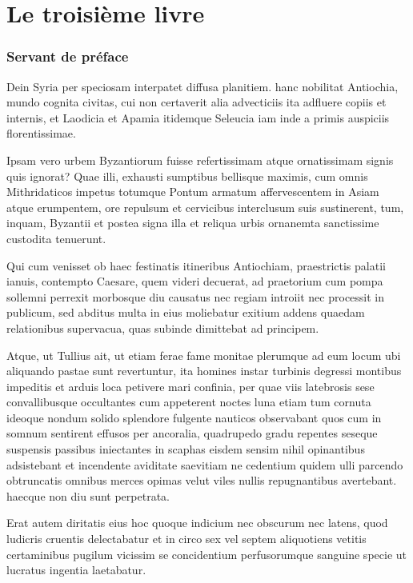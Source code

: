 
\part{Le troisième livre}
\section{Servant de préface}

Dein Syria per speciosam interpatet diffusa planitiem. hanc nobilitat Antiochia, mundo cognita civitas, cui non certaverit alia 
advecticiis ita adfluere copiis et internis, et Laodicia et Apamia itidemque Seleucia iam inde a primis auspiciis florentissimae.

Ipsam vero urbem Byzantiorum fuisse refertissimam atque ornatissimam signis quis ignorat? Quae illi, exhausti sumptibus bellisque 
maximis, cum omnis Mithridaticos impetus totumque Pontum armatum affervescentem in Asiam atque erumpentem, ore repulsum 
et cervicibus interclusum suis sustinerent, tum, inquam, Byzantii et postea signa illa et reliqua urbis ornanemta sanctissime 
custodita tenuerunt.

Qui cum venisset ob haec festinatis itineribus Antiochiam, praestrictis palatii ianuis, contempto Caesare, quem videri decuerat, ad 
praetorium cum pompa sollemni perrexit morbosque diu causatus nec regiam introiit nec processit in publicum, sed abditus multa in 
eius moliebatur exitium addens quaedam relationibus supervacua, quas subinde dimittebat ad principem.

Atque, ut Tullius ait, ut etiam ferae fame monitae plerumque ad eum locum ubi aliquando pastae sunt revertuntur, ita homines 
instar turbinis degressi montibus impeditis et arduis loca petivere mari confinia, per quae viis latebrosis sese convallibusque 
occultantes cum appeterent noctes luna etiam tum cornuta ideoque nondum solido splendore fulgente nauticos observabant quos 
cum in somnum sentirent effusos per ancoralia, quadrupedo gradu repentes seseque suspensis passibus iniectantes in scaphas 
eisdem sensim nihil opinantibus adsistebant et incendente aviditate saevitiam ne cedentium quidem ulli parcendo obtruncatis 
omnibus merces opimas velut viles nullis repugnantibus avertebant. haecque non diu sunt perpetrata.

Erat autem diritatis eius hoc quoque indicium nec obscurum nec latens, quod ludicris cruentis delectabatur et in circo sex vel 
septem aliquotiens vetitis certaminibus pugilum vicissim se concidentium perfusorumque sanguine specie ut lucratus ingentia 
laetabatur.

